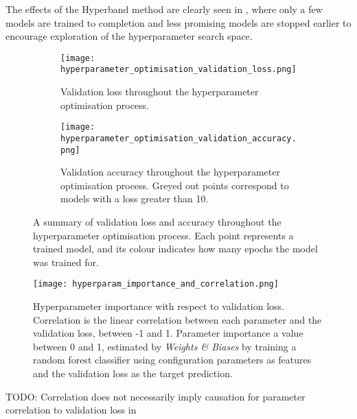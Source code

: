 The effects of the Hyperband method are clearly seen in \figureautorefname{ \ref{fig:hyperparameter_optimisation_validation_loss_and_accuracy}}, where only a few models are trained to completion and less promising models are stopped earlier to encourage exploration of the hyperparameter search space.

\begin{figure}
    \centering
    \begin{subfigure}[t]{\textwidth}
        \texttt{[image: hyperparameter\_optimisation\_validation\_loss.png]}
        \label{fig:hyperparameter_optimisation_validation_loss}
        \caption{Validation loss throughout the hyperparameter optimisation process.}
    \end{subfigure}
    \par\bigskip %
    \par\bigskip
    \begin{subfigure}[b]{\textwidth}
        \texttt{[image: hyperparameter\_optimisation\_validation\_accuracy.png]}
        \label{fig:hyperparameter_optimisation_validation_accuracy}
        \caption{Validation accuracy throughout the hyperparameter optimisation process. Greyed out points correspond to models with a loss greater than 10.}
    \end{subfigure}
    \caption{A summary of validation loss and accuracy throughout the hyperparameter optimisation process. Each point represents a trained model, and its colour indicates how many epochs the model was trained for.}
    \label{fig:hyperparameter_optimisation_validation_loss_and_accuracy}
\end{figure}

\begin{figure}
    \centering
    \texttt{[image: hyperparam\_importance\_and\_correlation.png]}
    \caption{Hyperparameter importance with respect to validation loss. Correlation is the linear correlation between each parameter and the validation loss, between -1 and 1. Parameter importance a value between 0 and 1, estimated by \textit{Weights \& Biases} \cite{wandb} by training a random forest classifier using configuration parameters as features and the validation loss as the target prediction.}
    \label{fig:hyperparam_importance_and_correlation}
\end{figure}

{\color{red} TODO: Correlation does not necessarily imply causation for parameter correlation to validation loss in \figureautorefname{ \ref{fig:hyperparam_importance_and_correlation}}}

